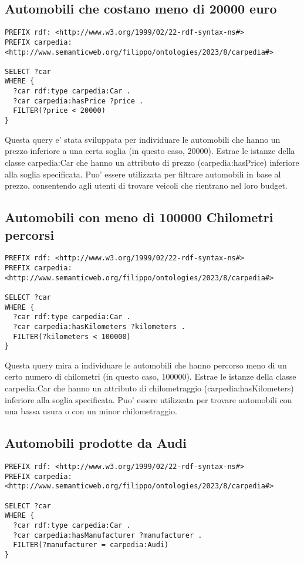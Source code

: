\subsection{Automobili che costano meno di 20000 euro}

\begin{lstlisting}[language=SPARQL]
PREFIX rdf: <http://www.w3.org/1999/02/22-rdf-syntax-ns#>
PREFIX carpedia: <http://www.semanticweb.org/filippo/ontologies/2023/8/carpedia#>

SELECT ?car
WHERE {
  ?car rdf:type carpedia:Car .
  ?car carpedia:hasPrice ?price .
  FILTER(?price < 20000)
}
\end{lstlisting}

Questa query e' stata sviluppata per individuare le automobili che hanno un prezzo inferiore a una certa
soglia (in questo caso, 20000). Estrae le istanze della classe carpedia:Car che hanno un attributo di prezzo
(carpedia:hasPrice) inferiore alla soglia specificata. Puo' essere utilizzata per filtrare automobili in base
al prezzo, consentendo agli utenti di trovare veicoli che rientrano nel loro budget.

\subsection{Automobili con meno di 100000 Chilometri percorsi}

\begin{lstlisting}[language=SPARQL]
PREFIX rdf: <http://www.w3.org/1999/02/22-rdf-syntax-ns#>
PREFIX carpedia: <http://www.semanticweb.org/filippo/ontologies/2023/8/carpedia#>

SELECT ?car
WHERE {
  ?car rdf:type carpedia:Car .
  ?car carpedia:hasKilometers ?kilometers .
  FILTER(?kilometers < 100000)
}
\end{lstlisting}


Questa query mira a individuare le automobili che hanno percorso meno di un certo numero di chilometri
(in questo caso, 100000). Estrae le istanze della classe carpedia:Car che hanno un attributo di chilometraggio
(carpedia:hasKilometers) inferiore alla soglia specificata.
Puo' essere utilizzata per trovare automobili con una bassa usura o con un minor chilometraggio.

\subsection{Automobili prodotte da Audi}

\begin{lstlisting}[language=SPARQL]
PREFIX rdf: <http://www.w3.org/1999/02/22-rdf-syntax-ns#>
PREFIX carpedia: <http://www.semanticweb.org/filippo/ontologies/2023/8/carpedia#>

SELECT ?car
WHERE {
  ?car rdf:type carpedia:Car .
  ?car carpedia:hasManufacturer ?manufacturer .
  FILTER(?manufacturer = carpedia:Audi)
}
\end{lstlisting}


